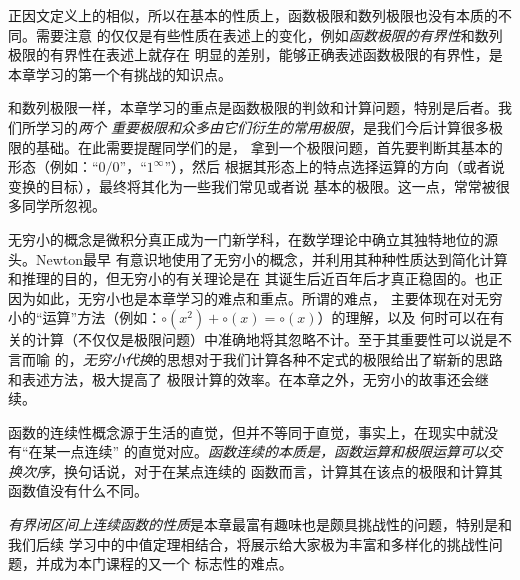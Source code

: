正因文定义上的相似，所以在基本的性质上，函数极限和数列极限也没有本质的不同。需要注意
的仅仅是有些性质在表述上的变化，例如{\it 函数极限的有界性}和数列极限的有界性在表述上就存在
明显的差别，能够正确表述函数极限的有界性，是本章学习的第一个有挑战的知识点。

和数列极限一样，本章学习的重点是函数极限的判敛和计算问题，特别是后者。我们所学习的{\it 两个
重要极限和众多由它们衍生的常用极限}，是我们今后计算很多极限的基础。在此需要提醒同学们的是，
拿到一个极限问题，首先要判断其基本的形态（例如：“$0/0$”，“$1^{\infty}$”），然后
根据其形态上的特点选择运算的方向（或者说变换的目标），最终将其化为一些我们常见或者说
基本的极限。这一点，常常被很多同学所忽视。

无穷小的概念是微积分真正成为一门新学科，在数学理论中确立其独特地位的源头。Newton最早
有意识地使用了无穷小的概念，并利用其种种性质达到简化计算和推理的目的，但无穷小的有关理论是在
其诞生后近百年后才真正稳固的。也正因为如此，无穷小也是本章学习的难点和重点。所谓的难点，
主要体现在对无穷小的“运算”方法（例如：$\circ(x^2)+\circ(x)=\circ(x)$）的理解，以及
何时可以在有关的计算（不仅仅是极限问题）中准确地将其忽略不计。至于其重要性可以说是不言而喻
的，{\it 无穷小代换}的思想对于我们计算各种不定式的极限给出了崭新的思路和表述方法，极大提高了
极限计算的效率。在本章之外，无穷小的故事还会继续。

函数的连续性概念源于生活的直觉，但并不等同于直觉，事实上，在现实中就没有“在某一点连续”
的直觉对应。{\it 函数连续的本质是，函数运算和极限运算可以交换次序}，换句话说，对于在某点连续的
函数而言，计算其在该点的极限和计算其函数值没有什么不同。

{\it 有界闭区间上连续函数的性质}是本章最富有趣味也是颇具挑战性的问题，特别是和我们后续
学习中的中值定理相结合，将展示给大家极为丰富和多样化的挑战性问题，并成为本门课程的又一个
标志性的难点。


